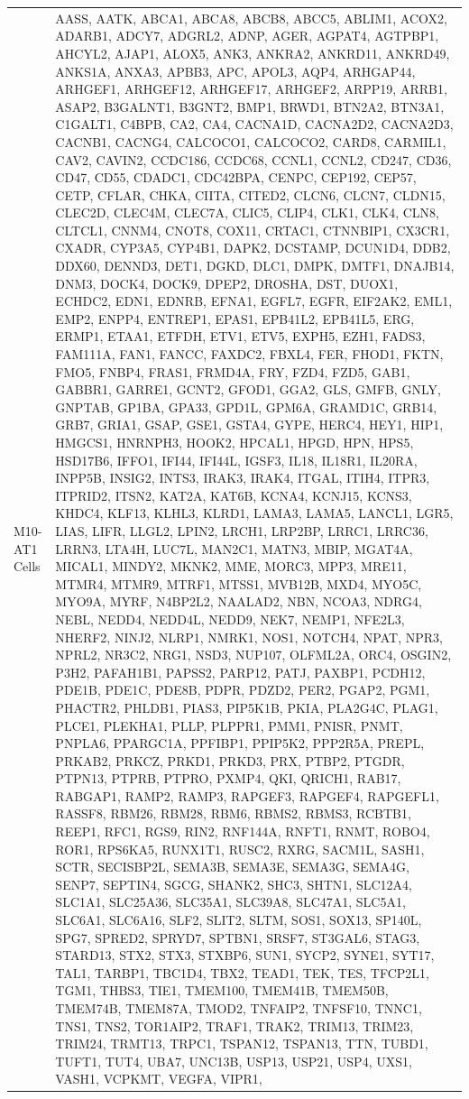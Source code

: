 \documentclass[
]{article}
\begin{document}
\begin{singlespace}
\begin{longtable}[t]{>{\raggedright\arraybackslash}p{1in}>{\raggedright\arraybackslash}p{5in}}
M10-AT1 Cells & AASS, AATK, ABCA1, ABCA8, ABCB8, ABCC5, ABLIM1, ACOX2, ADARB1, ADCY7, ADGRL2, ADNP, AGER, AGPAT4, AGTPBP1, AHCYL2, AJAP1, ALOX5, ANK3, ANKRA2, ANKRD11, ANKRD49, ANKS1A, ANXA3, APBB3, APC, APOL3, AQP4, ARHGAP44, ARHGEF1, ARHGEF12, ARHGEF17, ARHGEF2, ARPP19, ARRB1, ASAP2, B3GALNT1, B3GNT2, BMP1, BRWD1, BTN2A2, BTN3A1, C1GALT1, C4BPB, CA2, CA4, CACNA1D, CACNA2D2, CACNA2D3, CACNB1, CACNG4, CALCOCO1, CALCOCO2, CARD8, CARMIL1, CAV2, CAVIN2, CCDC186, CCDC68, CCNL1, CCNL2, CD247, CD36, CD47, CD55, CDADC1, CDC42BPA, CENPC, CEP192, CEP57, CETP, CFLAR, CHKA, CIITA, CITED2, CLCN6, CLCN7, CLDN15, CLEC2D, CLEC4M, CLEC7A, CLIC5, CLIP4, CLK1, CLK4, CLN8, CLTCL1, CNNM4, CNOT8, COX11, CRTAC1, CTNNBIP1, CX3CR1, CXADR, CYP3A5, CYP4B1, DAPK2, DCSTAMP, DCUN1D4, DDB2, DDX60, DENND3, DET1, DGKD, DLC1, DMPK, DMTF1, DNAJB14, DNM3, DOCK4, DOCK9, DPEP2, DROSHA, DST, DUOX1, ECHDC2, EDN1, EDNRB, EFNA1, EGFL7, EGFR, EIF2AK2, EML1, EMP2, ENPP4, ENTREP1, EPAS1, EPB41L2, EPB41L5, ERG, ERMP1, ETAA1, ETFDH, ETV1, ETV5, EXPH5, EZH1, FADS3, FAM111A, FAN1, FANCC, FAXDC2, FBXL4, FER, FHOD1, FKTN, FMO5, FNBP4, FRAS1, FRMD4A, FRY, FZD4, FZD5, GAB1, GABBR1, GARRE1, GCNT2, GFOD1, GGA2, GLS, GMFB, GNLY, GNPTAB, GP1BA, GPA33, GPD1L, GPM6A, GRAMD1C, GRB14, GRB7, GRIA1, GSAP, GSE1, GSTA4, GYPE, HERC4, HEY1, HIP1, HMGCS1, HNRNPH3, HOOK2, HPCAL1, HPGD, HPN, HPS5, HSD17B6, IFFO1, IFI44, IFI44L, IGSF3, IL18, IL18R1, IL20RA, INPP5B, INSIG2, INTS3, IRAK3, IRAK4, ITGAL, ITIH4, ITPR3, ITPRID2, ITSN2, KAT2A, KAT6B, KCNA4, KCNJ15, KCNS3, KHDC4, KLF13, KLHL3, KLRD1, LAMA3, LAMA5, LANCL1, LGR5, LIAS, LIFR, LLGL2, LPIN2, LRCH1, LRP2BP, LRRC1, LRRC36, LRRN3, LTA4H, LUC7L, MAN2C1, MATN3, MBIP, MGAT4A, MICAL1, MINDY2, MKNK2, MME, MORC3, MPP3, MRE11, MTMR4, MTMR9, MTRF1, MTSS1, MVB12B, MXD4, MYO5C, MYO9A, MYRF, N4BP2L2, NAALAD2, NBN, NCOA3, NDRG4, NEBL, NEDD4, NEDD4L, NEDD9, NEK7, NEMP1, NFE2L3, NHERF2, NINJ2, NLRP1, NMRK1, NOS1, NOTCH4, NPAT, NPR3, NPRL2, NR3C2, NRG1, NSD3, NUP107, OLFML2A, ORC4, OSGIN2, P3H2, PAFAH1B1, PAPSS2, PARP12, PATJ, PAXBP1, PCDH12, PDE1B, PDE1C, PDE8B, PDPR, PDZD2, PER2, PGAP2, PGM1, PHACTR2, PHLDB1, PIAS3, PIP5K1B, PKIA, PLA2G4C, PLAG1, PLCE1, PLEKHA1, PLLP, PLPPR1, PMM1, PNISR, PNMT, PNPLA6, PPARGC1A, PPFIBP1, PPIP5K2, PPP2R5A, PREPL, PRKAB2, PRKCZ, PRKD1, PRKD3, PRX, PTBP2, PTGDR, PTPN13, PTPRB, PTPRO, PXMP4, QKI, QRICH1, RAB17, RABGAP1, RAMP2, RAMP3, RAPGEF3, RAPGEF4, RAPGEFL1, RASSF8, RBM26, RBM28, RBM6, RBMS2, RBMS3, RCBTB1, REEP1, RFC1, RGS9, RIN2, RNF144A, RNFT1, RNMT, ROBO4, ROR1, RPS6KA5, RUNX1T1, RUSC2, RXRG, SACM1L, SASH1, SCTR, SECISBP2L, SEMA3B, SEMA3E, SEMA3G, SEMA4G, SENP7, SEPTIN4, SGCG, SHANK2, SHC3, SHTN1, SLC12A4, SLC1A1, SLC25A36, SLC35A1, SLC39A8, SLC47A1, SLC5A1, SLC6A1, SLC6A16, SLF2, SLIT2, SLTM, SOS1, SOX13, SP140L, SPG7, SPRED2, SPRYD7, SPTBN1, SRSF7, ST3GAL6, STAG3, STARD13, STX2, STX3, STXBP6, SUN1, SYCP2, SYNE1, SYT17, TAL1, TARBP1, TBC1D4, TBX2, TEAD1, TEK, TES, TFCP2L1, TGM1, THBS3, TIE1, TMEM100, TMEM41B, TMEM50B, TMEM74B, TMEM87A, TMOD2, TNFAIP2, TNFSF10, TNNC1, TNS1, TNS2, TOR1AIP2, TRAF1, TRAK2, TRIM13, TRIM23, TRIM24, TRMT13, TRPC1, TSPAN12, TSPAN13, TTN, TUBD1, TUFT1, TUT4, UBA7, UNC13B, USP13, USP21, USP4, UXS1, VASH1, VCPKMT, VEGFA, VIPR1, 
\end{longtable}
\end{singlespace}
\end{document}
